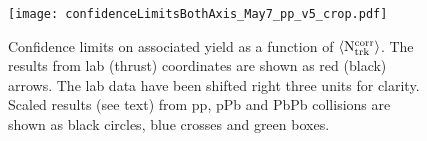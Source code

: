 \documentclass[aps,prl,twocolumn,superscriptaddress,groupedaddress]{revtex4}  %
\begin{document}


\begin{figure}[!t]
\begin{center}
\texttt{[image: confidenceLimitsBothAxis\_May7\_pp\_v5\_crop.pdf]}
\caption{Confidence limits on associated yield as a function of $\left \langle {\rm N}_{\mathrm{trk}}^{\mathrm{corr}} \right \rangle$. The results from lab (thrust) coordinates are shown as red (black) arrows. The lab data have been shifted right three units for clarity.  Scaled results (see text) from pp, pPb and PbPb collisions are shown as black circles, blue crosses and green boxes.}
\label{fig:confidenceLimitsBothAxis} 
\end{center}
\end{figure}
\end{document}

